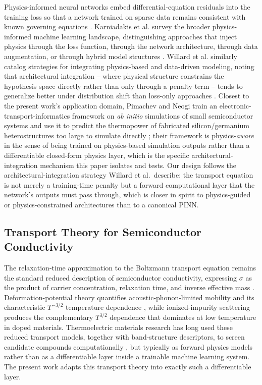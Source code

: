 \documentclass[11pt]{article}
\begin{document}
Physics-informed neural networks embed differential-equation residuals into the training loss so that a network trained on sparse data remains consistent with known governing equations \citep{raissi2019pinn}. Karniadakis et al. survey the broader physics-informed machine learning landscape, distinguishing approaches that inject physics through the loss function, through the network architecture, through data augmentation, or through hybrid model structures \citep{karniadakis2021pgml}. Willard et al. similarly catalog strategies for integrating physics-based and data-driven modeling, noting that architectural integration -- where physical structure constrains the hypothesis space directly rather than only through a penalty term -- tends to generalize better under distribution shift than loss-only approaches \citep{willard2020integrating}. Closest to the present work's application domain, Pimachev and Neogi train an electronic-transport-informatics framework on \emph{ab initio} simulations of small semiconductor systems and use it to predict the thermopower of fabricated silicon/germanium heterostructures too large to simulate directly \citep{pimachev2021transport}; their framework is physics-\emph{aware} in the sense of being trained on physics-based simulation outputs rather than a differentiable closed-form physics layer, which is the specific architectural-integration mechanism this paper isolates and tests. Our design follows the architectural-integration strategy Willard et al.\ describe: the transport equation is not merely a training-time penalty but a forward computational layer that the network's outputs must pass through, which is closer in spirit to physics-guided or physics-constrained architectures than to a canonical PINN.

\subsection{Transport Theory for Semiconductor Conductivity}

The relaxation-time approximation to the Boltzmann transport equation remains the standard reduced description of semiconductor conductivity, expressing $\sigma$ as the product of carrier concentration, relaxation time, and inverse effective mass \citep{ashcroftmermin1976}. Deformation-potential theory quantifies acoustic-phonon-limited mobility and its characteristic $T^{-3/2}$ temperature dependence \citep{bardeen1950deformation}, while ionized-impurity scattering produces the complementary $T^{3/2}$ dependence that dominates at low temperature in doped materials. Thermoelectric materials research has long used these reduced transport models, together with band-structure descriptors, to screen candidate compounds computationally \citep{gorai2017computationally,snyder2008complex}, but typically as forward physics models rather than as a differentiable layer inside a trainable machine learning system. The present work adapts this transport theory into exactly such a differentiable layer.
\end{document}

